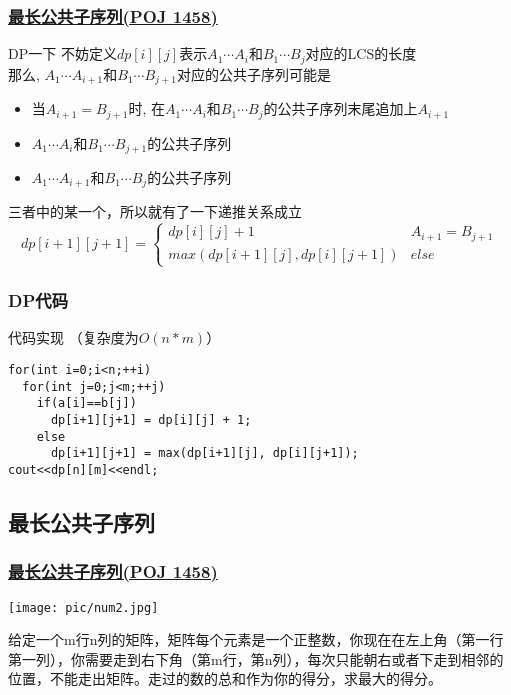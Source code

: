 \documentclass{beamer}
\begin{document}
\begin{frame}[fragile]
\frametitle{\href{http://poj.org/problem?id=1458}{最长公共子序列(POJ 1458)}}
\begin{block}{DP一下}
	不妨定义$dp[i][j]$表示$A_1\cdots A_i$和$B_1\cdots B_j$对应的LCS的长度\\
	那么, $A_1\cdots A_{i+1}$和$B_1\cdots B_{j+1}$对应的公共子序列可能是\\
	\begin{itemize}\footnotesize	
		\item 当$A_{i+1}=B_{j+1}$时, 在$A_1\cdots A_{i}$和$B_1\cdots B_{j}$的公共子序列末尾追加上$A_{i+1}$
		\item  $A_1\cdots A_{i}$和$B_1\cdots B_{j+1}$的公共子序列
		\item  $A_1\cdots A_{i+1}$和$B_1\cdots B_{j}$的公共子序列
	\end{itemize}
	三者中的某一个，所以就有了一下递推关系成立
	$$dp[i+1][j+1] =
	\begin{cases}
	dp[i][j]+1 & A_{i+1} =B_{j+1} \\
	max(dp[i+1][j],dp[i][j+1]) & else
	\end{cases}$$
\end{block}
\end{frame}

\begin{frame}[fragile]
\frametitle{DP代码}
\begin{block}{代码实现  （复杂度为$O(n*m)$）}
	\begin{lstlisting}
for(int i=0;i<n;++i)
  for(int j=0;j<m;++j)
    if(a[i]==b[j])  
      dp[i+1][j+1] = dp[i][j] + 1;
    else            
      dp[i+1][j+1] = max(dp[i+1][j], dp[i][j+1]);
cout<<dp[n][m]<<endl;
	\end{lstlisting}
\end{block}
\end{frame}



\iffalse
\subsection{最长公共子序列}
\begin{frame}
\frametitle{\href{http://poj.org/problem?id=1458}{最长公共子序列(POJ 1458)}}

\begin{minipage}[b]{0.30\linewidth}
\texttt{[image: pic/num2.jpg]}
\end{minipage}
\hfill
\begin{minipage}[b]{0.55\linewidth}

给定一个m行n列的矩阵，矩阵每个元素是一个正整数，你现在在左上角（第一行第一列），你需要走到右下角（第m行，第n列），每次只能朝右或者下走到相邻的位置，不能走出矩阵。走过的数的总和作为你的得分，求最大的得分。

\end{minipage}
\end{frame}
\end{document}
